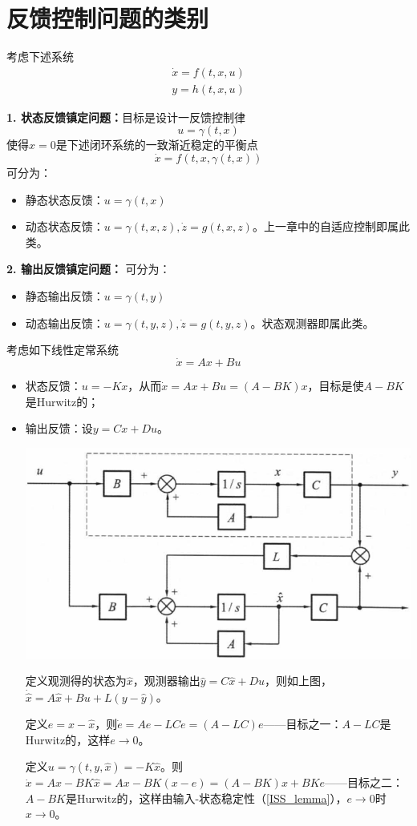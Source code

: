 \section{反馈控制问题的类别}\label{5Aref}
考虑下述系统
\begin{equation}
    \begin{aligned}
  \dot{x} = f (t, x, u)\\
  y = h (t, x, u)
\end{aligned}\label{sys:1}
\end{equation}

\textbf{1. 状态反馈镇定问题：}目标是设计一反馈控制律
\[ u = \gamma (t, x) \]
使得$x = 0$是下述闭环系统的一致渐近稳定的平衡点
\[ \dot{x} = f (t, x, \gamma (t, x)) \]
可分为：
\begin{itemize}[leftmargin=1em]
    \item 静态状态反馈：$u = \gamma (t, x)$
    \item 动态状态反馈：$u = \gamma (t, x, z), \dot{z} = g (t, x, z)$。上一章中的自适应控制即属此类。
\end{itemize}

\textbf{2. 输出反馈镇定问题：}
可分为：
\begin{itemize}[leftmargin=1em]
\item 静态输出反馈：$u = \gamma (t, y)$
\item 动态输出反馈：$u = \gamma (t, y, z), \dot{z} = g (t, y, z)$。状态观测器即属此类。
\end{itemize}

\begin{example}
  考虑如下线性定常系统
  \[ \dot{x} = A x + B u \]
 \begin{itemize}[leftmargin=1em]
  \item 状态反馈：$u = - K x$，从而$\dot{x} = A x + B u = (A - B K) x$，目标是使$A - B K$是Hurwitz的；
  
  \item 输出反馈：设$y=Cx+Du$。

  \begin{center}
      \includegraphics[width=0.45\linewidth]{figure/adaptive/state_observer.png}
      \label{fig:state-observer}
  \end{center}
  
  定义观测得的状态为$\hat{x}$，观测器输出$\hat{y} = C  \hat{x} + D  u$，则如上图，
  $\dot{\hat{x}} = A  \hat{x} + B  u + L(y - \hat{y})$。

  定义$e = x - \hat{x}$，则$\dot{e} = A e - L C e = (A - L C) e$——目标之一：$A - L C$是Hurwitz的，这样$e\to 0$。
  
  定义$u =\gamma(t,y,\hat{x})= - K \hat{x}$。则$\dot{x} = A x - B K \hat{x}=Ax-BK(x-e)=(A-BK)x+BKe$——目标之二：$A-BK$是Hurwitz的，这样由输入-状态稳定性（\ref{ISS_lemma}），$e\to 0$时$x\to 0$。
  \end{itemize}
\end{example}

